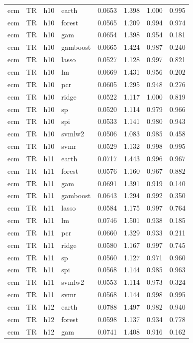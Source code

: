 \begin{ThreePartTable}
\begin{longtable}[t]{llclcccc}
\addlinespace
ecm & TR & h10 & earth & 0.0653 & 1.398 & 1.000 & 0.995\\
ecm & TR & h10 & forest & 0.0565 & 1.209 & 0.994 & 0.974\\
ecm & TR & h10 & gam & 0.0654 & 1.398 & 0.954 & 0.181\\
ecm & TR & h10 & gamboost & 0.0665 & 1.424 & 0.987 & 0.240\\
ecm & TR & h10 & lasso & 0.0527 & 1.128 & 0.997 & 0.821\\
ecm & TR & h10 & lm & 0.0669 & 1.431 & 0.956 & 0.202\\
ecm & TR & h10 & pcr & 0.0605 & 1.295 & 0.948 & 0.276\\
ecm & TR & h10 & ridge & 0.0522 & 1.117 & 1.000 & 0.819\\
ecm & TR & h10 & sp & 0.0520 & 1.114 & 0.979 & 0.966\\
ecm & TR & h10 & spi & 0.0533 & 1.141 & 0.980 & 0.943\\
ecm & TR & h10 & svmlw2 & 0.0506 & 1.083 & 0.985 & 0.458\\
ecm & TR & h10 & svmr & 0.0529 & 1.132 & 0.998 & 0.995\\
\addlinespace
ecm & TR & h11 & earth & 0.0717 & 1.443 & 0.996 & 0.967\\
ecm & TR & h11 & forest & 0.0576 & 1.160 & 0.967 & 0.882\\
ecm & TR & h11 & gam & 0.0691 & 1.391 & 0.919 & 0.140\\
ecm & TR & h11 & gamboost & 0.0643 & 1.294 & 0.992 & 0.350\\
ecm & TR & h11 & lasso & 0.0584 & 1.175 & 0.997 & 0.764\\
ecm & TR & h11 & lm & 0.0746 & 1.501 & 0.938 & 0.185\\
ecm & TR & h11 & pcr & 0.0660 & 1.329 & 0.933 & 0.211\\
ecm & TR & h11 & ridge & 0.0580 & 1.167 & 0.997 & 0.745\\
ecm & TR & h11 & sp & 0.0560 & 1.127 & 0.971 & 0.960\\
ecm & TR & h11 & spi & 0.0568 & 1.144 & 0.985 & 0.963\\
ecm & TR & h11 & svmlw2 & 0.0553 & 1.114 & 0.973 & 0.324\\
ecm & TR & h11 & svmr & 0.0568 & 1.144 & 0.998 & 0.995\\
\addlinespace
ecm & TR & h12 & earth & 0.0788 & 1.497 & 0.982 & 0.940\\
ecm & TR & h12 & forest & 0.0598 & 1.137 & 0.934 & 0.778\\
ecm & TR & h12 & gam & 0.0741 & 1.408 & 0.916 & 0.162\\

\end{longtable}
\end{ThreePartTable}
